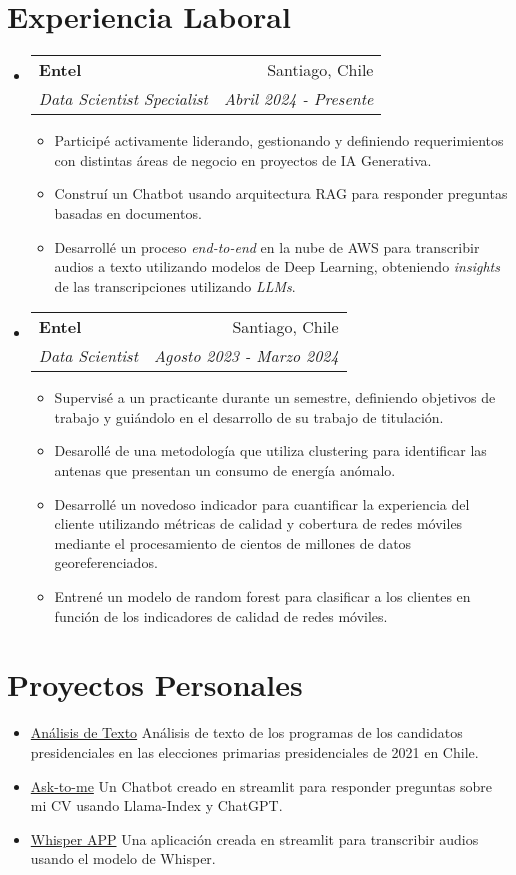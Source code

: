 \documentclass[letterpaper,11pt]{article}
\makeatletter
\newcommand{\resumeItem}[2]{
  \item\small{
    \textbf{#1}{#2 \vspace{-2pt}}
  }
}
\newcommand{\resumeSubheading}[4]{
  \vspace{-1pt}\item
    \begin{tabular*}{0.97\textwidth}{l@{\extracolsep{\fill}}r}
      \textbf{#1} & #2 \\
      \textit{\small#3} & \textit{\small #4} \\
    \end{tabular*}\vspace{-8pt}
}
\newcommand{\resumeSubItem}[2]{\resumeItem{#1}{#2}\vspace{-4pt}}
\newcommand{\resumeSubHeadingListStart}{\begin{itemize}[leftmargin=*]}
\newcommand{\resumeSubHeadingListEnd}{\end{itemize}}
\newcommand{\resumeItemListStart}{\begin{itemize}}
\newcommand{\resumeItemListEnd}{\end{itemize}\vspace{-5pt}}
\makeatother
\begin{document}
\section{Experiencia Laboral}
  \resumeSubHeadingListStart

    \resumeSubheading
      {Entel}{Santiago, Chile}
      {Data Scientist Specialist}{Abril 2024 - Presente}
      \resumeItemListStart
      \resumeItem{}
        {Participé activamente liderando, gestionando y definiendo requerimientos con distintas áreas de negocio en proyectos de IA Generativa.}
        \resumeItem{}
          {Construí un Chatbot usando arquitectura RAG para responder preguntas basadas en documentos.}
        \resumeItem{}
          {Desarrollé un proceso \textit{end-to-end} en la nube de AWS para transcribir audios a texto utilizando modelos de Deep Learning, obteniendo \textit{insights} de las transcripciones utilizando \textit{LLMs}.}
      \resumeItemListEnd

    \resumeSubheading
      {Entel}{Santiago, Chile}
      {Data Scientist}{Agosto 2023 - Marzo 2024}
      \resumeItemListStart
        \resumeItem{}
          {Supervisé a un practicante durante un semestre, definiendo objetivos de trabajo y guiándolo en el desarrollo de su trabajo de titulación.}
        \resumeItem{}
          {Desarollé de una metodología que utiliza clustering para identificar las antenas que presentan un consumo de energía anómalo.}
        \resumeItem{}
          {Desarrollé un novedoso indicador para cuantificar la experiencia del cliente utilizando métricas de calidad y cobertura de redes móviles mediante el procesamiento de cientos de millones de datos georeferenciados.}
        \resumeItem{}
          {Entrené un modelo de random forest para clasificar a los clientes en función de los indicadores de calidad de redes móviles.}
      \resumeItemListEnd

  \resumeSubHeadingListEnd


\section{Proyectos Personales}
  \resumeSubHeadingListStart
  \resumeSubItem{}
  {\href{https://github.com/SebasUrbina/TextAnalysisProgramaCandidatos2021}{Análisis de Texto} Análisis de texto de los programas de los candidatos presidenciales en las elecciones primarias presidenciales de 2021 en Chile.}
  \resumeSubItem{}
  {\href{https://github.com/SebasUrbina/ask-to-me}{Ask-to-me} Un Chatbot creado en streamlit para responder preguntas sobre mi CV usando Llama-Index y ChatGPT.}
  \resumeSubItem{}
      {\href{https://github.com/SebasUrbina/whisper-app}{Whisper APP} Una aplicación creada en streamlit para transcribir audios usando el modelo de Whisper.}
  \resumeSubHeadingListEnd
\end{document}
